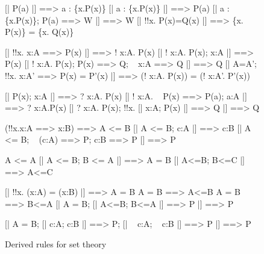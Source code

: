\begin{figure} \underscoreon
\begin{ttbox}
      [| P(a) |] ==> a : \{x.P(x)\}
      [| a : \{x.P(x)\} |] ==> P(a)
      [| a : \{x.P(x)\};  P(a) ==> W |] ==> W
  [| !!x. P(x)=Q(x) |] ==> \{x. P(x)\} = \{x. Q(x)\}

         [| !!x. x:A ==> P(x) |] ==> ! x:A. P(x)
         [| ! x:A. P(x);  x:A |] ==> P(x)
         [| ! x:A. P(x);  P(x) ==> Q;  ~ x:A ==> Q |] ==> Q
     [| A=A';  !!x. x:A' ==> P(x) = P'(x) |] ==>
              (! x:A. P(x)) = (! x:A'. P'(x))

          [| P(x);  x:A |] ==> ? x:A. P(x)
         [| ! x:A. ~ P(x) ==> P(a);  a:A |] ==> ? x:A.P(x)
          [| ? x:A. P(x);  !!x. [| x:A; P(x) |] ==> Q  |] ==> Q

         (!!x.x:A ==> x:B) ==> A <= B
         [| A <= B;  c:A |] ==> c:B
        [| A <= B;  ~ (c:A) ==> P;  c:B ==> P |] ==> P

     A <= A
  [| A <= B;  B <= A |] ==> A = B
    [| A<=B;  B<=C |] ==> A<=C

         [| !!x. (x:A) = (x:B) |] ==> A = B
      A = B ==> A<=B
      A = B ==> B<=A
       [| A = B;  [| A<=B; B<=A |] ==> P |]  ==>  P

      [| A = B;  [| c:A; c:B |] ==> P;  
                           [| ~ c:A; ~ c:B |] ==> P 
                |]  ==>  P
\end{ttbox}
\caption{Derived rules for set theory} \label{hol-set1}
\end{figure}


